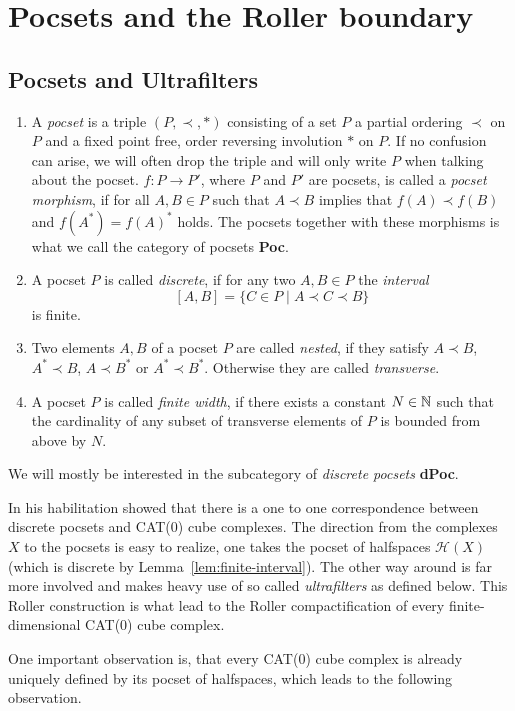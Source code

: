 \section{Pocsets and the Roller boundary}
\label{sec:roller}

\subsection{Pocsets and Ultrafilters}
\label{sec:pocset}

\begin{defin}
  \begin{enumerate}
  \item A \emph{pocset} is a triple \((P, \prec, \ast)\) consisting of a set \(P\) a partial ordering \(\prec\) on \(P\) and a fixed point free, order reversing involution \(\ast\) on \(P\). If no confusion can arise, we will often drop the triple and will only write \(P\) when talking about the pocset. \(f \colon P \to P'\), where \(P\) and \(P'\) are pocsets, is called a \emph{pocset morphism}, if for all \(A, B \in P\) such that \(A \prec B\) implies that \(f(A) \prec f(B)\) and \(f(A^\ast) = f(A)^\ast\) holds. The pocsets together with these morphisms is what we call the category of pocsets {\textbf{Poc}}.
  \item A pocset \(P\) is called \emph{discrete}, if for any two \(A, B \in P\) the \emph{interval}
    \[
      [A,B] = \{C \in P \mid A \prec C \prec B\}
    \]
    is finite.
  \item Two elements \(A,B\) of a pocset \(P\) are called \emph{nested}, if they satisfy \(A \prec B\), \(A^\ast \prec B\), \(A \prec B^\ast\) or \(A^\ast \prec B^\ast\). Otherwise they are called \emph{transverse}.
  \item A pocset \(P\) is called \emph{finite width}, if there exists a constant \(N \in \mathbb{N}\) such that the cardinality of any subset of transverse elements of \(P\) is bounded from above by \(N\).
  \end{enumerate}
  We will mostly be interested in the subcategory of \emph{discrete pocsets} \textbf{dPoc}.
\end{defin}

\begin{rem}
  \label{rem:roller}
  In his habilitation \textcite{Roller1999} showed that there is a one to one correspondence between discrete pocsets and CAT(0) cube complexes. The direction from the complexes \(X\) to the pocsets is easy to realize, one takes the pocset of halfspaces \(\mathcal{H}(X)\) (which is discrete by Lemma~\ref{lem:finite-interval}). The other way around is far more involved and makes heavy use of so called \emph{ultrafilters} as defined below. This Roller construction is what lead to the Roller compactification of every finite-dimensional CAT(0) cube complex.

  One important observation is, that every CAT(0) cube complex is already uniquely defined by its pocset of halfspaces, which leads to the following observation.
\end{rem}

